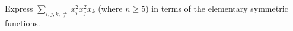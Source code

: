 Express $\sum_{i,j,k,\neq} x_i^2 x_j^2 x_k$ (where $n \geq 5$) in terms of the elementary symmetric functions.